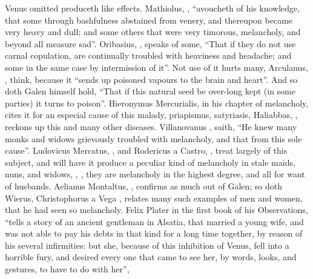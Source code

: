 Venus omitted produceth like effects. Mathiolus, , \enquote{avoucheth of his knowledge, that some
through bashfulness abstained from venery, and thereupon became very heavy and
dull; and some others that were very timorous, melancholy, and beyond all
measure sad}. Oribasius, ,
speaks of some, \enquote{That if they do not use carnal
copulation, are continually troubled with heaviness and headache; and some in
the same case by intermission of it}. Not use of it hurts many, Arculanus,
, think,
because it \enquote{sends up poisoned vapours to the brain and
heart}. And so doth Galen himself hold, \enquote{That if this natural seed be over-long
kept (in some parties) it turns to poison}. Hieronymus Mercurialis, in his
chapter of melancholy, cites it for an especial cause of this malady,
priapismus, satyriasis, \etc{} Haliabbas,
, reckons up this and many other
diseases. Villanovanus , saith, \enquote{He
knew many monks and widows grievously troubled with
melancholy, and that from this sole cause}. Ludovicus
Mercatus, , and
Rodericus a Castro, , treat
largely of this subject, and will have it produce a peculiar kind of melancholy
in stale maids, nuns, and widows, , \etc{}, they
are melancholy in the highest degree, and all for want of husbands. Aelianus
Montaltus, , confirms as much out
of Galen; so doth Wierus, Christophorus a Vega , relates many such examples of men and women, that he had
seen so melancholy. Felix Plater in the first book of his Observations,
\enquote{tells a story of an ancient gentleman in Alsatia, that
married a young wife, and was not able to pay his debts in that kind for a long
time together, by reason of his several infirmities: but she, because of this
inhibition of Venus, fell into a horrible fury, and desired every one that came
to see her, by words, looks, and gestures, to have to do with her}, \etc{}
